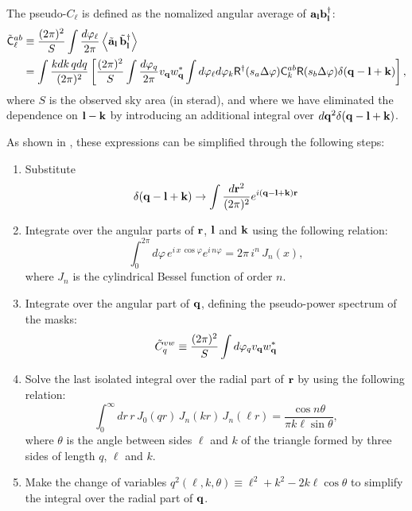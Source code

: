 \documentclass[a4paper,10pt]{article}
\begin{document}
    The pseudo-$C_\ell$ is defined as the nomalized angular average of ${\bf a}_{\bf l}{\bf b}^\dag_{\bf l}$:
    \begin{align}
      \tilde{\sf C}^{ab}_\ell
      &\equiv\frac{(2\pi)^2}{S}\int\frac{d\varphi_\ell}{2\pi}\left\langle\tilde{\bf a}_{\bf l}\,\tilde{\bf b}^\dag_{\bf l}\right\rangle\\
      &=\int\frac{kdk\,qdq}{(2\pi)^2}\left[\frac{(2\pi)^2}{S}\int\frac{d\varphi_q}{2\pi}v_{{\bf q}}w^*_{{\bf q}}
      \int d\varphi_\ell d\varphi_k{\sf R}^\dag(s_a\Delta\varphi){\sf C}^{ab}_k{\sf R}(s_b\Delta\varphi)\delta({\bf q}-{\bf l}+{\bf k})\right],
    \end{align}
    where $S$ is the observed sky area (in sterad), and where we have eliminated the dependence on ${\bf l}-{\bf k}$ by introducing an additional integral over $d{\bf q}^2\delta({\bf q}-{\bf l}+{\bf k})$.
    
    As shown in \cite{2016arXiv161204664A}, these expressions can be simplified through the following steps:
    \begin{enumerate}
     \item Substitute
       \begin{equation}
         \delta({\bf q}-{\bf l}+{\bf k})\rightarrow\int\frac{d{\bf r}^2}{(2\pi)^2}e^{i({\bf q}-{\bf l}+{\bf k}){\bf r}}
       \end{equation}
     \item Integrate over the angular parts of ${\bf r}$, ${\bf l}$ and ${\bf k}$ using the following relation:
       \begin{equation}
        \int_0^{2\pi} d\varphi\,e^{i\,x\,\cos\varphi}e^{i\,n\varphi}=2\pi\,i^n\,J_n(x),
       \end{equation}
       where $J_n$ is the cylindrical Bessel function of order $n$.
     \item Integrate over the angular part of ${\bf q}$, defining the pseudo-power spectrum of the masks:
       \begin{equation}
         \tilde{C}^{vw}_q\equiv\frac{(2\pi)^2}{S}\int d\varphi_qv_{\bf q}w^*_{\bf q}
       \end{equation}
     \item Solve the last isolated integral over the radial part of ${\bf r}$ by using the following relation:
       \begin{equation}
         \int_0^\infty dr\,r\,J_0(qr)\,J_n(kr)\,J_n(\ell r)=\frac{\cos n\theta}{\pi k\ell\sin\theta},
       \end{equation}
       where $\theta$ is the angle between sides $\ell$ and $k$ of the triangle formed by three sides of length $q$, $\ell$ and $k$.
     \item Make the change of variables $q^2(\ell,k,\theta)\equiv\ell^2+k^2-2k\ell\cos\theta$ to simplify the integral over the radial part of ${\bf q}$.
    \end{enumerate}
    
\end{document}
